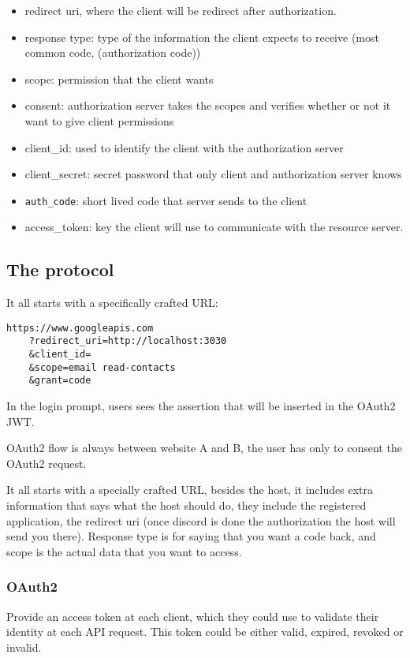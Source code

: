 \begin{itemize}
    \item  redirect uri, where the client will be redirect after authorization.
    \item  response type: type of the information the client expects to receive
        (most common code, (authorization code))
    \item  scope: permission that the client wants
    \item  consent: authorization server takes the scopes and verifies whether or not
        it want to give client permissions
    \item  client\_id: used to identify the client with the authorization server
    \item  client\_secret: secret password that only client and authorization server knows
    \item  \texttt{auth\_code}: short lived code that server sends to the client
    \item access\_token: key the client will use to communicate with the resource server.
\end{itemize}

\subsection{The protocol}
It all starts with a specifically crafted URL:
\begin{lstlisting}
https://www.googleapis.com
    ?redirect_uri=http://localhost:3030
    &client_id=
    &scope=email read-contacts
    &grant=code
\end{lstlisting}

In the login prompt, users sees the assertion that will be inserted in the
OAuth2 JWT.

OAuth2 flow is always between website A and B, the user has only to consent the
OAuth2 request.

It all starts with a specially crafted URL, besides the host, it includes extra
information that says what the host should do, they include the registered
application, the redirect uri (once discord is done the authorization the host
will send you there). Response type is for saying that you want a code back, and
scope is the actual data that you want to access.


\subsubsection{OAuth2}
Provide an access token at each client, which they could use to validate their
identity at each API request.  This token could be either valid, expired,
revoked or invalid.

